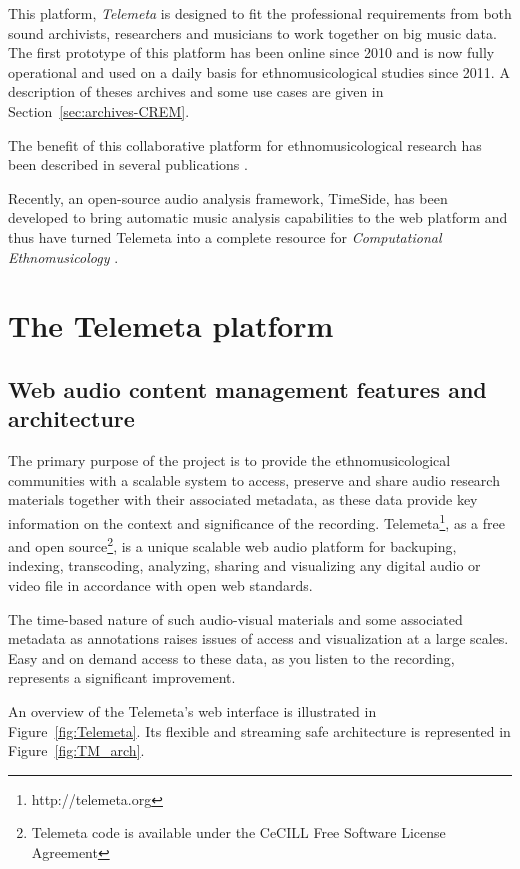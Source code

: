 \documentclass{paper}
\begin{document}
 This platform, \emph{Telemeta} is designed to fit the professional requirements from both sound archivists, researchers and musicians to work together on big music data. The first prototype of this platform has been online since 2010 and is now fully operational and used on a daily basis for ethnomusicological studies since 2011. A description of theses archives and some use cases are given in Section~\ref{sec:archives-CREM}.

The benefit of this collaborative platform for ethnomusicological research has been described in several publications \citep{Simmonot_IASA_2011, Julien_IASA_2011, Simonnot_ICTM_2014}.

Recently, an open-source audio analysis framework, TimeSide, has been developed to bring automatic music analysis capabilities to the web platform and thus have turned Telemeta into a complete resource for \emph{Computational Ethnomusicology} \citep{Tzanetakis_2007_JIMS, Gomez_JNMR_2013}.

 \section{The Telemeta platform}\label{sec:Telemeta}
 \subsection{Web audio content management features and architecture}
The primary purpose of the project is to provide the ethnomusicological communities with a scalable system to access, preserve and share audio research materials together with their associated metadata, as these data provide key information on the context and significance of the recording. Telemeta\footnote{http://telemeta.org}, as a free and open source\footnote{Telemeta code is available under the CeCILL Free Software License Agreement}, is a unique scalable web audio platform for backuping, indexing, transcoding, analyzing, sharing and visualizing any digital audio or video file in accordance with open web standards.

The time-based nature of such audio-visual materials and some associated metadata as annotations raises issues of access and visualization at a large scales. Easy and on demand access to these data, as you listen to the recording, represents a significant improvement.

An overview of the Telemeta's web interface is illustrated in Figure~\ref{fig:Telemeta}. Its flexible and streaming safe   architecture is represented in Figure~\ref{fig:TM_arch}.
\end{document}
